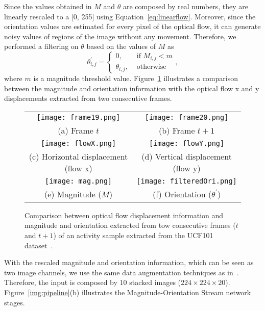 \documentclass[10pt,conference]{IEEEtran}
\begin{document}
Since the values obtained in $M$ and $\theta$ are composed by real numbers, they are linearly rescaled to a [0, 255] using  Equation~\ref{eq:linearflow}. Moreover, since the orientation values are estimated for every pixel of the optical flow, it can generate noisy values of regions of the image without any movement. Therefore, we performed a filtering on $\theta$ based on the values of $M$ as 
\begin{equation}\label{eq:orifilter}
	\theta^{'}_{i,j} = \left\{
	\begin{array}{rl}
		0, &\mbox{ if $M_{i,j} < m$} \\
		\theta_{i,j}, &\mbox{ otherwise }
	\end{array} \right.,
\end{equation}
\noindent where $m$ is a magnitude threshold value. Figure~\ref{img:orimag} illustrates a comparison between the magnitude and orientation information with the optical flow x and y displacements extracted from two consecutive frames.

\begin{figure}[!t]
	\centering
	\begin{tabular}{cc}
		\texttt{[image: frame19.png]} & \texttt{[image: frame20.png]} \\
		\footnotesize{(a) Frame $t$} & \footnotesize{(b) Frame $t+1$} \\
		\texttt{[image: flowX.png]} & \texttt{[image: flowY.png]} \\
		\footnotesize{(c) Horizontal displacement (flow x)} & \footnotesize{(d) Vertical displacement (flow y)} \\
		\texttt{[image: mag.png]} & \texttt{[image: filteredOri.png]} \\
		\footnotesize{(e) Magnitude ($M$)} & \footnotesize{(f) Orientation ($\theta^{'}$)} \\
	\end{tabular}
	\caption{Comparison between optical flow displacement information and magnitude and orientation extracted from tow consecutive frames ($t$ and $t+1$) of an activity sample extracted from the UCF101 dataset~\cite{Soomro:2012}.}
	\label{img:orimag}
\end{figure}


With the rescaled magnitude and orientation information, which can be seen as two image channels, we use the same data augmentation techniques as in~\cite{Wang:2015}. Therefore, the input is composed by 10 stacked images ($224\times224\times20$). Figure~\ref{img:pipeline}(b) illustrates the Magnitude-Orientation Stream network stages.
\end{document}
